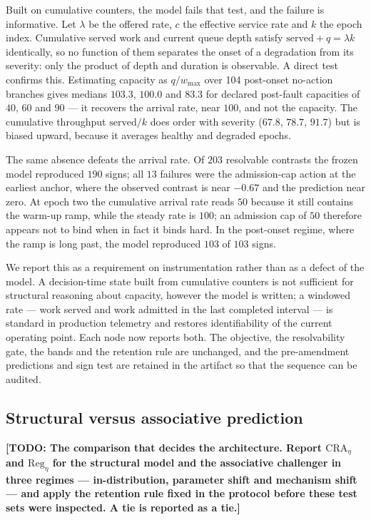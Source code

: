 \documentclass[journal]{IEEEtran}
\newcommand{\TODO}[1]{\textbf{[TODO: #1]}}
\begin{document}
Built on cumulative counters, the model fails that test, and the failure is
informative. Let $\lambda$ be the offered rate, $c$ the effective service rate
and $k$ the epoch index. Cumulative served work and current queue depth satisfy
$\mathrm{served} + q = \lambda k$ identically, so no function of them separates
the onset of a degradation from its severity: only the product of depth and
duration is observable. A direct test confirms this. Estimating capacity as
$q/w_{\max}$ over 104 post-onset no-action branches gives medians $103.3$,
$100.0$ and $83.3$ for declared post-fault capacities of $40$, $60$ and $90$ ---
it recovers the arrival rate, near $100$, and not the capacity. The cumulative
throughput $\mathrm{served}/k$ does order with severity ($67.8$, $78.7$, $91.7$)
but is biased upward, because it averages healthy and degraded epochs.

The same absence defeats the arrival rate. Of $203$ resolvable contrasts the
frozen model reproduced $190$ signs; all $13$ failures were the admission-cap
action at the earliest anchor, where the observed contrast is near $-0.67$ and
the prediction near zero. At epoch two the cumulative arrival rate reads $50$
because it still contains the warm-up ramp, while the steady rate is $100$; an
admission cap of $50$ therefore appears not to bind when in fact it binds hard.
In the post-onset regime, where the ramp is long past, the model reproduced
$103$ of $103$ signs.

We report this as a requirement on instrumentation rather than as a defect of
the model. A decision-time state built from cumulative counters is not
sufficient for structural reasoning about capacity, however the model is
written; a windowed rate --- work served and work admitted in the last completed
interval --- is standard in production telemetry and restores identifiability of
the current operating point. Each node now reports both. The objective, the
resolvability gate, the bands and the retention rule are unchanged, and the
pre-amendment predictions and sign test are retained in the artifact so that the
sequence can be audited.

\subsection{Structural versus associative prediction}
\label{sec:results-b5}
\TODO{The comparison that decides the architecture. Report
$\mathrm{CRA}_\eta$ and $\mathrm{Reg}_\eta$ for the structural model and the
associative challenger in three regimes --- in-distribution, parameter shift and
mechanism shift --- and apply the retention rule fixed in the protocol before
these test sets were inspected. A tie is reported as a tie.}
\end{document}
